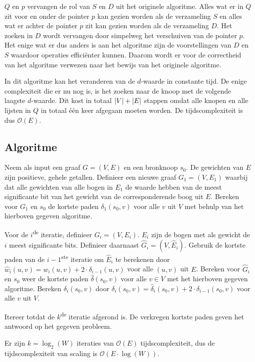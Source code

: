\documentclass[conference]{IEEEtran}
\theoremstyle{definition}
\DeclarePairedDelimiter{\card}{\vert}{\vert}  %
\begin{document}
$Q$ en $p$ vervangen de rol van $S$ en $D$ uit het originele algoritme. Alles wat er in $Q$ zit voor en onder de pointer $p$ kan gezien worden als de verzameling $S$ en alles wat er achter de pointer $p$ zit kan gezien worden als de verzameling $D$. Het zoeken in $D$ wordt vervangen door simpelweg het verschuiven van de pointer $p$. Het enige wat er dus anders is aan het algoritme zijn de voorstellingen van $D$ en $S$ waardoor operaties efficiënter kunnen. Daarom wordt er voor de correctheid van het algoritme verwezen naar het bewijs van het originele algoritme.

In dit algoritme kan het veranderen van de $d$-waarde in constante tijd. De enige complexiteit die er nu nog is, is het zoeken naar de knoop met de volgende laagste $d$-waarde. Dit kost in totaal $\card{V} + \card{E}$ stappen omdat alle knopen en alle lijsten in $Q$ in totaal één keer afgegaan moeten worden. De tijdscomplexiteit is dus $\mathcal{O}(E)$.

\subsection{Algoritme}
Neem als input een graaf $G = (V, E)$ en een bronknoop $s_0$. De gewichten van $E$ zijn positieve, gehele getallen. Definieer een nieuwe graaf $G_1 = (V, E_1)$ waarbij dat alle gewichten van alle bogen in $E_1$ de waarde hebben van de meest significante bit van het gewicht van de corresponderende boog uit $E$. Bereken voor $G_1$ en $s_0$ de kortste paden $\delta_1(s_0, v)$ voor alle $v$ uit $V$ met behulp van het hierboven gegeven algoritme.

Voor de $i$\textsuperscript{de} iteratie, definieer $G_i = (V, E_i)$. $E_i$ zijn de bogen met als gewicht de $i$ meest significante bits. Definieer daarnaast $\hat{G}_i = (V, \hat{E}_i)$. Gebruik de kortste paden van de $i-1$\textsuperscript{ste} iteratie om $\hat{E}_i$ te berekenen door $\hat{w}_i(u, v) = w_i(u, v) + 2 \cdot \delta_{i-1}(u, v)$ voor alle $(u, v)$ uit $E$. Bereken voor $\hat{G}_i$ en $s_0$ weer de kortste paden $\hat{\delta}(s_0, v)$ voor alle $v \in V$ met het hierboven gegeven algoritme. Bereken $\delta_i(s_0, v)$ door $\delta_i(s_0, v) = \hat{\delta}_i(s_0, v) + 2 \cdot \delta_{i-1}(s_0, v)$ voor alle $v$ uit $V$.

Itereer totdat de $k$\textsuperscript{de} iteratie afgerond is. De verkregen kortste paden geven het antwoord op het gegeven probleem.

Er zijn $k = \log_2(W)$ iteraties van $\mathcal{O}(E)$ tijdscomplexiteit, dus de tijdscomplexiteit van scaling is $\mathcal{O}(E \cdot \log(W))$.
\end{document}
